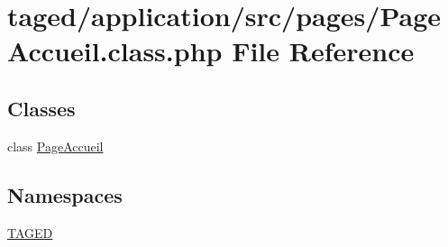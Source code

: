 \hypertarget{_page_accueil_8class_8php}{}\section{taged/application/src/pages/\+Page\+Accueil.class.\+php File Reference}
\label{_page_accueil_8class_8php}
\subsection*{Classes}
\begin{DoxyCompactItemize}
\item 
class \hyperlink{class_page_accueil}{Page\+Accueil}
\end{DoxyCompactItemize}
\subsection*{Namespaces}
\begin{DoxyCompactItemize}
\item 
 \hyperlink{namespace_t_a_g_e_d}{T\+A\+G\+ED}
\end{DoxyCompactItemize}

